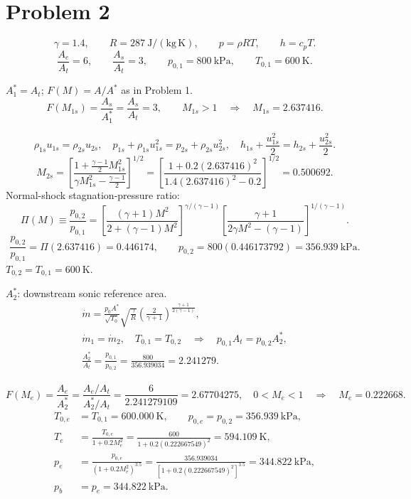 \section*{Problem 2}


\[
\gamma=1.4,\qquad R=287~\mathrm{J/(kg\,K)},\qquad p=\rho RT,\qquad h=c_pT.
\]
\[
\frac{A_e}{A_t}=6,\qquad \frac{A_s}{A_t}=3,\qquad
p_{0,1}=800~\mathrm{kPa},\qquad T_{0,1}=600~\mathrm{K}.
\]

$A_1^*=A_t$; $F(M)=A/A^*$ as in Problem 1.
\[
F(M_{1s})=\frac{A_s}{A_1^*}=\frac{A_s}{A_t}=3,
\qquad M_{1s}>1
\quad\Longrightarrow\quad \boxed{M_{1s}=2.637416}.
\]

\[
\rho_{1s}u_{1s}=\rho_{2s}u_{2s},\quad
p_{1s}+\rho_{1s}u_{1s}^2=p_{2s}+\rho_{2s}u_{2s}^2,\quad
h_{1s}+\frac{u_{1s}^2}{2}=h_{2s}+\frac{u_{2s}^2}{2}.
\]
\[
M_{2s}=\left[\frac{1+\frac{\gamma-1}{2}M_{1s}^2}
{\gamma M_{1s}^2-\frac{\gamma-1}{2}}\right]^{1/2}
=\left[\frac{1+0.2(2.637416)^2}{1.4(2.637416)^2-0.2}\right]^{1/2}
=\boxed{0.500692}.
\]
Normal-shock stagnation-pressure ratio:
\[
\Pi(M)\equiv\frac{p_{0,2}}{p_{0,1}}
=\left[\frac{(\gamma+1)M^2}{2+(\gamma-1)M^2}\right]^{\gamma/(\gamma-1)}
\left[\frac{\gamma+1}{2\gamma M^2-(\gamma-1)}\right]^{1/(\gamma-1)}.
\]
\[
\frac{p_{0,2}}{p_{0,1}}=\Pi(2.637416)=\boxed{0.446174},\qquad
p_{0,2}=800(0.446173792)=\boxed{356.939~\mathrm{kPa}}.
\]
$T_{0,2}=T_{0,1}=600~\mathrm{K}$.

$A_2^*$: downstream sonic reference area.
\begin{gather*}
\dot m=\frac{p_0A^*}{\sqrt{T_0}}\sqrt{\frac{\gamma}{R}}
\left(\frac{2}{\gamma+1}\right)^{\frac{\gamma+1}{2(\gamma-1)}},\\
\dot m_1=\dot m_2,\quad T_{0,1}=T_{0,2}
\quad\Longrightarrow\quad p_{0,1}A_t=p_{0,2}A_2^*,\\
\frac{A_2^*}{A_t}=\frac{p_{0,1}}{p_{0,2}}
=\frac{800}{356.939034}=\boxed{2.241279}.
\end{gather*}

\[
F(M_e)=\frac{A_e}{A_2^*}
=\frac{A_e/A_t}{A_2^*/A_t}
=\frac{6}{2.241279109}=2.67704275,
\quad 0<M_e<1
\quad\Longrightarrow\quad\boxed{M_e=0.222668}.
\]
\begin{align*}
T_{0,e}&=T_{0,1}=\boxed{600.000~\mathrm{K}},\qquad
p_{0,e}=p_{0,2}=\boxed{356.939~\mathrm{kPa}},\\
T_e&=\frac{T_{0,e}}{1+0.2M_e^2}
=\frac{600}{1+0.2(0.222667549)^2}=\boxed{594.109~\mathrm{K}},\\
p_e&=\frac{p_{0,e}}{(1+0.2M_e^2)^{3.5}}
=\frac{356.939034}{[1+0.2(0.222667549)^2]^{3.5}}
=\boxed{344.822~\mathrm{kPa}},\\
p_b&=p_e=\boxed{344.822~\mathrm{kPa}}.
\end{align*}

